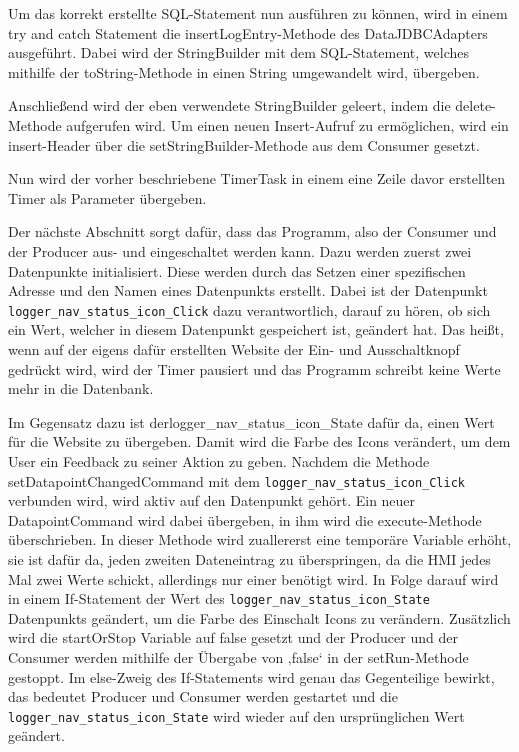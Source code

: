 Um das korrekt erstellte SQL-Statement nun ausführen zu können, wird in einem try and catch Statement die insertLogEntry-Methode des DataJDBCAdapters ausgeführt. Dabei wird der StringBuilder mit dem SQL-Statement, welches mithilfe der toString-Methode in einen String umgewandelt wird, übergeben.
 
Anschließend wird der eben verwendete StringBuilder geleert, indem die delete-Methode aufgerufen wird. Um einen neuen Insert-Aufruf zu ermöglichen, wird ein insert-Header über die setStringBuilder-Methode aus dem Consumer gesetzt.
 
Nun wird der vorher beschriebene TimerTask in einem eine Zeile davor erstellten Timer als Parameter übergeben.
 
Der nächste Abschnitt sorgt dafür, dass das Programm, also der Consumer und der Producer aus- und eingeschaltet werden kann. Dazu werden zuerst zwei Datenpunkte initialisiert. Diese werden durch das Setzen einer spezifischen Adresse und den Namen eines Datenpunkts erstellt. Dabei ist der Datenpunkt \texttt{logger\_nav\_status\_icon\_Click} dazu verantwortlich, darauf zu hören, ob sich ein Wert, welcher in diesem Datenpunkt gespeichert ist, geändert hat. Das heißt, wenn auf der eigens dafür erstellten Website der Ein- und Ausschaltknopf gedrückt wird, wird der Timer pausiert und das Programm schreibt keine Werte mehr in die Datenbank. 

Im Gegensatz dazu ist der{logger\_nav\_status\_icon\_State} dafür da, einen Wert für die Website zu übergeben. Damit wird die Farbe des Icons verändert, um dem User ein Feedback zu seiner Aktion zu geben.
Nachdem die Methode setDatapointChangedCommand mit dem \texttt{logger\_nav\_status\_icon\_Click} verbunden wird, wird aktiv auf den Datenpunkt gehört. Ein neuer DatapointCommand wird dabei übergeben, in ihm wird die execute-Methode überschrieben. In dieser Methode wird zuallererst eine temporäre Variable erhöht, sie ist dafür da, jeden zweiten Dateneintrag zu überspringen, da die HMI jedes Mal zwei Werte schickt, allerdings nur einer benötigt wird. In Folge darauf wird in einem If-Statement der Wert des \texttt{logger\_nav\_status\_icon\_State} Datenpunkts geändert, um die Farbe des Einschalt Icons zu verändern. Zusätzlich wird die startOrStop Variable auf false gesetzt und der Producer und der Consumer werden mithilfe der Übergabe von ‚false‘ in der setRun-Methode gestoppt. Im else-Zweig des If-Statements wird genau das Gegenteilige bewirkt, das bedeutet Producer und Consumer werden gestartet und die \texttt{logger\_nav\_status\_icon\_State} wird wieder auf den ursprünglichen Wert geändert.
 
